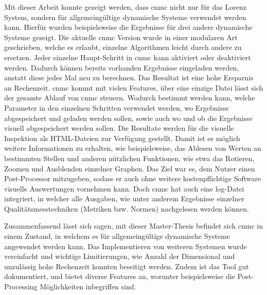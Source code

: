 Mit dieser Arbeit konnte gezeigt werden, dass \gls{cnmc} nicht nur für das Lorenz System, sondern für allgemeingültige dynamische Systeme verwendet werden kann. Hierfür wurden beispielsweise die Ergebnisse für drei andere dynamische Systeme gezeigt. Die aktuelle \gls{cnmc} Version wurde in einer modularen Art geschrieben, welche es erlaubt, einzelne Algorithmen leicht durch andere zu ersetzen. 
Jeder einzelne Haupt-Schritt in \gls{cnmc} kann aktiviert oder deaktiviert werden. Dadurch können bereits vorhanden Ergebnisse eingeladen werden, anstatt diese jedes Mal neu zu berechnen. Das Resultat ist eine hohe Ersparnis an Rechenzeit. \gls{cnmc} kommt mit vielen Features, über eine einzige Datei lässt sich der gesamte Ablauf von \gls{cnmc} steuern. Wodurch bestimmt werden kann,  welche Parameter in den einzelnen Schritten verwendet werden, wo Ergebnisse abgespeichert und geladen werden sollen, sowie auch wo und ob die Ergebnisse visuell abgespeichert werden sollen. 
Die Resultate werden für die visuelle Inspektion als HTML-Dateien zur Verfügung gestellt. Damit ist es möglich weitere Informationen zu erhalten, wie beispielsweise, das Ablesen von Werten an bestimmten Stellen und anderen nützlichen Funktionen, wie etwa das Rotieren, Zoomen und Ausblenden einzelner Graphen. 
Das Ziel war es, dem Nutzer einen Post-Processor mitzugeben, sodass er auch ohne weitere kostenpflichtige Software visuelle Auswertungen vornehmen kann. Doch \gls{cnmc} hat auch eine log-Datei integriert, in welcher alle Ausgaben, wie unter anderem Ergebnisse einzelner Qualitätsmesstechniken (Metriken bzw. Normen) nachgelesen werden können.\newline


Zusammenfassend lässt sich sagen, mit dieser Master-Thesis befindet sich \gls{cnmc} in einem Zustand, in welchem es für allgemeingültige dynamische Systeme angewendet werden kann. Das Implementieren von weiteren Systemen wurde vereinfacht und wichtige Limitierungen, wie Anzahl der Dimensional und unzulässig hohe Rechenzeit konnten beseitigt werden. Zudem ist das Tool gut dokumentiert, und bietet diverse Features an, worunter beispielsweise die Post-Processing Möglichkeiten inbegriffen sind.




